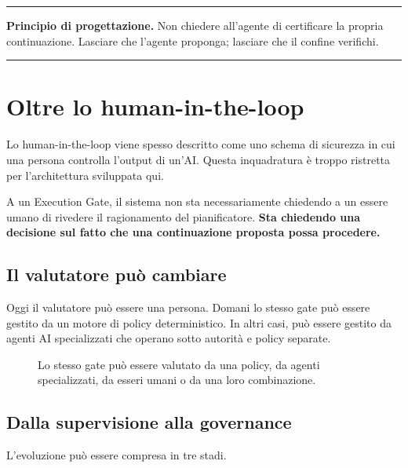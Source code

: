 \documentclass[10pt,oneside,openany]{book}
\newcommand{\principle}[1]{%
  \vspace{4pt}
  \noindent\begin{minipage}{\linewidth}
  \hrule\vspace{5pt}
  \small\sffamily\raggedright\textbf{Principio di progettazione.} #1
  \vspace{5pt}\hrule
  \end{minipage}\vspace{4pt}
}
\begin{document}
\principle{Non chiedere all'agente di certificare la propria continuazione. Lasciare che l'agente proponga; lasciare che il confine verifichi.}

\chapter{Oltre lo human-in-the-loop}

Lo human-in-the-loop viene spesso descritto come uno schema di sicurezza in cui una persona controlla l'output di un'AI. Questa inquadratura è troppo ristretta per l'architettura sviluppata qui.

A un Execution Gate, il sistema non sta necessariamente chiedendo a un essere umano di rivedere il ragionamento del pianificatore. \textbf{Sta chiedendo una decisione sul fatto che una continuazione proposta possa procedere.}

\section{Il valutatore può cambiare}
Oggi il valutatore può essere una persona. Domani lo stesso gate può essere gestito da un motore di policy deterministico. In altri casi, può essere gestito da agenti AI specializzati che operano sotto autorità e policy separate.

\begin{figure}[ht]
\centering
{}
\caption{Lo stesso gate può essere valutato da una policy, da agenti specializzati, da esseri umani o da una loro combinazione.}
\end{figure}

\section{Dalla supervisione alla governance}
L'evoluzione può essere compresa in tre stadi.
\end{document}
